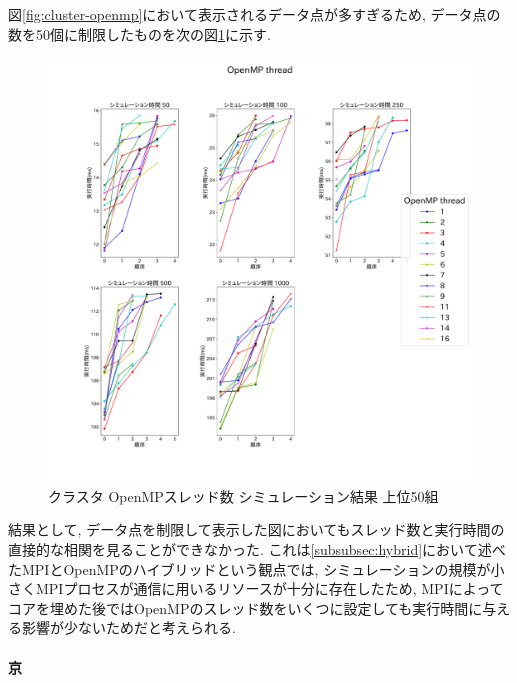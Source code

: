 図\ref{fig:cluster-openmp}において表示されるデータ点が多すぎるため,
データ点の数を50個に制限したものを次の図\ref{fig:cluster-openmp-top50}に示す.\\
\begin{figure}[htb]
\begin{center}
    \includegraphics[width=14cm]{./images/cluster-top50-OpenMP-thread.pdf}
    \caption{クラスタ OpenMPスレッド数 シミュレーション結果 上位50組}
    \label{fig:cluster-openmp-top50}
\end{center}
\end{figure}

結果として, データ点を制限して表示した図においてもスレッド数と実行時間の直接的な相関を見ることができなかった.
これは\ref{subsubsec:hybrid}において述べたMPIとOpenMPのハイブリッドという観点では,
シミュレーションの規模が小さくMPIプロセスが通信に用いるリソースが十分に存在したため,
MPIによってコアを埋めた後ではOpenMPのスレッド数をいくつに設定しても実行時間に与える影響が少ないためだと考えられる.\\
\clearpage

\paragraph{京}~\\


